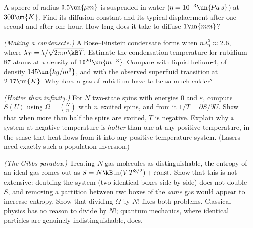\begin{problems}
 A sphere of radius $0.5\un{\mu m}$ is suspended in water ($\eta = 10^{-3}\un{Pa\,s}$) at $300\un{K}$. Find its diffusion constant and its typical displacement after one second and after one hour. How long does it take to diffuse $1\un{mm}$?

\core \emph{(Making a condensate.)} A Bose--Einstein condensate forms when $n\lambda_T^3\approx2.6$, where $\lambda_T = h/\sqrt{2\pi m\kB T}$. Estimate the condensation temperature for rubidium-87 atoms at a density of $10^{20}\un{m^{-3}}$. Compare with liquid helium-4, of density $145\un{kg/m^3}$, and with the observed superfluid transition at $2.17\un{K}$. Why does a gas of rubidium have to be so much colder?

 \emph{(Hotter than infinity.)} For $N$ two-state spins with energies $0$ and $\varepsilon$, compute $S(U)$ using $\Omega = \binom{N}{n}$ with $n$ excited spins, and from it $1/T = \partial S/\partial U$. Show that when more than half the spins are excited, $T$ is negative. Explain why a system at negative temperature is \emph{hotter} than one at any positive temperature, in the sense that heat flows from it into any positive-temperature system. (Lasers need exactly such a population inversion.)

 \emph{(The Gibbs paradox.)} Treating $N$ gas molecules as distinguishable, the entropy of an ideal gas comes out as $S = N\kB\ln(V\,T^{3/2}) + \text{const}$. Show that this is not extensive: doubling the system (two identical boxes side by side) does not double $S$, and removing a partition between two boxes of the \emph{same} gas would appear to increase entropy. Show that dividing $\Omega$ by $N!$ fixes both problems. Classical physics has no reason to divide by $N!$; quantum mechanics, where identical particles are genuinely indistinguishable, does.
\end{problems}

\begin{reading}
\end{reading}
